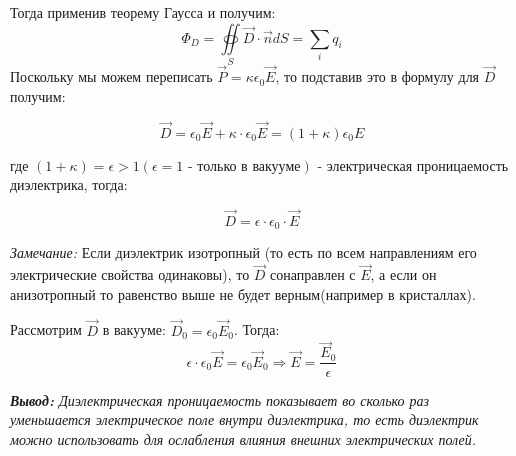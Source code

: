 \documentclass[../main.tex]{subfiles}
\begin{document}
Тогда применив теорему Гаусса и получим:
\[\Phi_D = \oiint\limits_S \vec D \cdot \vec n dS = \sum_{i} q_i\]
Поскольку мы можем переписать $\vec P = \kappa \epsilon_0 \vec E$, то подставив это в формулу для $\vec D$ получим:

\[\vec D = \epsilon_0 \vec E + \kappa \cdot \epsilon_0 \vec E = (1+\kappa)\epsilon_0 E\]
\begin{center}
    где $(1+\kappa) = \epsilon > 1 (\epsilon = 1 \text{ - только в вакууме})$ - электрическая проницаемость диэлектрика, тогда:    
\end{center}

\[\vec D = \epsilon \cdot \epsilon_0 \cdot \vec E\]

\textit{Замечание:  }Если диэлектрик изотропный (то есть по всем направлениям его электрические свойства одинаковы), то $\vec D$ сонаправлен с $\vec E$, а если он анизотропный то равенство выше не будет верным(например в кристаллах).

\vspace{5px}

Рассмотрим $\vec D$ в вакууме: $\vec D_0 = \epsilon_0 \vec E_0$. Тогда:
\[\epsilon \cdot \epsilon_0 \vec E = \epsilon_0 \vec E_0 \Rightarrow \vec E = \frac{\vec E_0}{\epsilon}\]


\textit{\textbf{Вывод:} Диэлектрическая проницаемость показывает во сколько раз уменьшается электрическое поле внутри диэлектрика, 
то есть диэлектрик можно использовать для ослабления влияния внешних электрических полей.}
\end{document}
